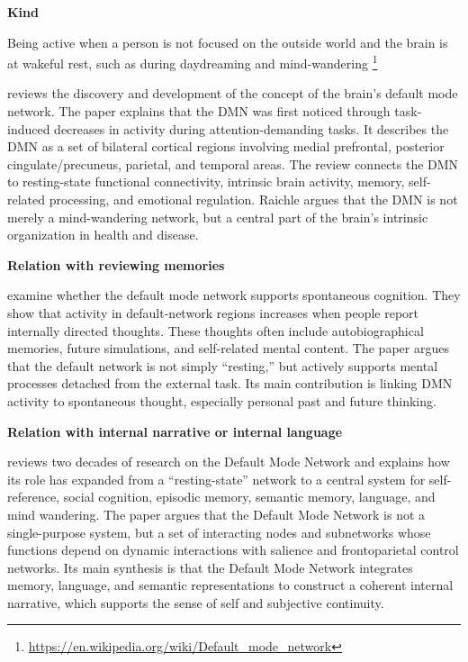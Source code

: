 \documentclass{book}
\providecommand{\ProjectDeepHeading}[2]{%
    \par\medskip\noindent\textbf{#2}\par\smallskip
}
\providecommand{\seeherefooter}[1]{\footnote{\url{#1}}}
\begin{document}
\ProjectDeepHeading{8}{Kind}


Being active when a person is not focused on the outside world and the brain is at wakeful rest, such as during daydreaming and mind-wandering \seeherefooter{https://en.wikipedia.org/wiki/Default_mode_network}
    
    \cite{raichle-2015-the-brains-default-mode-network} reviews the discovery and development of the concept of the brain’s default mode network. The paper explains that the DMN was first noticed through task-induced decreases in activity during attention-demanding tasks.
    It describes the DMN as a set of bilateral cortical regions involving medial prefrontal, posterior cingulate/precuneus, parietal, and temporal areas. The review connects the DMN to resting-state functional connectivity, intrinsic brain activity, memory, self-related processing, and emotional regulation. Raichle argues that the DMN is not merely a mind-wandering network, but a central part of the brain’s intrinsic organization in health and disease.
    
    
    \ProjectDeepHeading{11}{Relation with reviewing memories}
        \cite{andrews-hanna-2010-evidence-for-the-default-networks-role-in-spontaneous-cognition}
        examine whether the default mode network supports spontaneous cognition. They show that activity in default-network regions increases when people report internally directed thoughts. These thoughts often include autobiographical memories, future simulations, and self-related mental content. The paper argues that the default network is not simply “resting,” but actively supports mental processes detached from the external task. Its main contribution is linking DMN activity to spontaneous thought, especially personal past and future thinking.
    
    
    \ProjectDeepHeading{11}{Relation with internal narrative or internal language}
        \cite{menon-2023-20-years-of-the-default-mode-network-a-review-and-synthesis} reviews two decades of research on the Default Mode Network and explains how its role has expanded from a “resting-state” network to a central system for self-reference, social cognition, episodic memory, semantic memory, language, and mind wandering. The paper argues that the Default Mode Network is not a single-purpose system, but a set of interacting nodes and subnetworks whose functions depend on dynamic interactions with salience and frontoparietal control networks. Its main synthesis is that the Default Mode Network integrates memory, language, and semantic representations to construct a coherent internal narrative, which supports the sense of self and subjective continuity.
\end{document}
